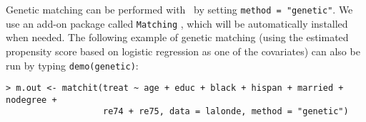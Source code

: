 Genetic matching can be performed with \MatchIt\ by setting
\texttt{method = "genetic"}.  We use an add-on package called
\texttt{Matching} \citep{Sekhon04}, which will be automatically
installed when needed.  The following example of genetic matching
(using the estimated propensity score based on logistic regression as
one of the covariates) can also be run by typing {\tt demo(genetic)}:
\begin{verbatim}
> m.out <- matchit(treat ~ age + educ + black + hispan + married + nodegree + 
                   re74 + re75, data = lalonde, method = "genetic")
\end{verbatim}


